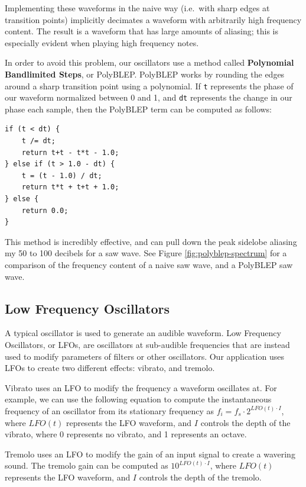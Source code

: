 \documentclass[letterpaper,12pt]{article}
\begin{document}
Implementing these waveforms in the naive way (i.e.\ with sharp edges at transition points) implicitly decimates a waveform with arbitrarily high frequency content. The result is a waveform that has large amounts of aliasing; this is especially evident when playing high frequency notes.


In order to avoid this problem, our oscillators use a method called \textbf{Polynomial Bandlimited Steps}, or PolyBLEP\cite{polyblep}. PolyBLEP works by rounding the edges around a sharp transition point using a polynomial. If \texttt{t} represents the phase of our waveform normalized between 0 and 1, and \texttt{dt} represents the change in our phase each sample, then the PolyBLEP term can be computed as follows:

\begin{verbatim}
if (t < dt) {
    t /= dt;
    return t+t - t*t - 1.0;
} else if (t > 1.0 - dt) {
    t = (t - 1.0) / dt;
    return t*t + t+t + 1.0;
} else {
    return 0.0;
}
\end{verbatim}

This method is incredibly effective, and can pull down the peak sidelobe aliasing my 50 to 100 decibels for a saw wave. See Figure \ref{fig:polyblep-spectrum} for a comparison of the frequency content of a naive saw wave, and a PolyBLEP saw wave.


\subsection{Low Frequency Oscillators}

A typical oscillator is used to generate an audible waveform. Low Frequency Oscillators, or LFOs, are oscillators at sub-audible frequencies that are instead used to modify parameters of filters or other oscillators. Our application uses LFOs to create two different effects: vibrato, and tremolo.

Vibrato uses an LFO to modify the frequency a waveform oscillates at. For example, we can use the following equation to compute the instantaneous frequency of an oscillator from its stationary frequency as $f_i = f_s \cdot 2^{LFO(t) \cdot I}$, where $LFO(t)$ represents the LFO waveform, and $I$ controls the depth of the vibrato, where 0 represents no vibrato, and 1 represents an octave.

Tremolo uses an LFO to modify the gain of an input signal to create a wavering sound. The tremolo gain can be computed as $10^{LFO(t) \cdot I}$, where $LFO(t)$ represents the LFO waveform, and $I$ controls the depth of the tremolo.
\end{document}
